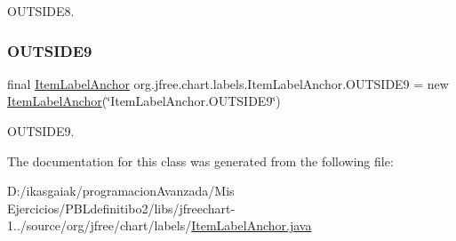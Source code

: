 O\+U\+T\+S\+I\+D\+E8. \mbox{\label{classorg_1_1jfree_1_1chart_1_1labels_1_1_item_label_anchor_a8a60cf2278910d0e80c56efdb4ef01ea}} 
\subsubsection{\texorpdfstring{O\+U\+T\+S\+I\+D\+E9}{OUTSIDE9}}
{\footnotesize\ttfamily final \mbox{\hyperlink{classorg_1_1jfree_1_1chart_1_1labels_1_1_item_label_anchor}{Item\+Label\+Anchor}} org.\+jfree.\+chart.\+labels.\+Item\+Label\+Anchor.\+O\+U\+T\+S\+I\+D\+E9 = new \mbox{\hyperlink{classorg_1_1jfree_1_1chart_1_1labels_1_1_item_label_anchor}{Item\+Label\+Anchor}}(\char`\"{}Item\+Label\+Anchor.\+O\+U\+T\+S\+I\+D\+E9\char`\"{})\hspace{0.3cm}{\ttfamily [static]}}

O\+U\+T\+S\+I\+D\+E9. 

The documentation for this class was generated from the following file\+:\begin{DoxyCompactItemize}
\item 
D\+:/ikasgaiak/programacion\+Avanzada/\+Mis Ejercicios/\+P\+B\+Ldefinitibo2/libs/jfreechart-\/1../source/org/jfree/chart/labels/\mbox{\hyperlink{_item_label_anchor_8java}{Item\+Label\+Anchor.\+java}}\end{DoxyCompactItemize}
